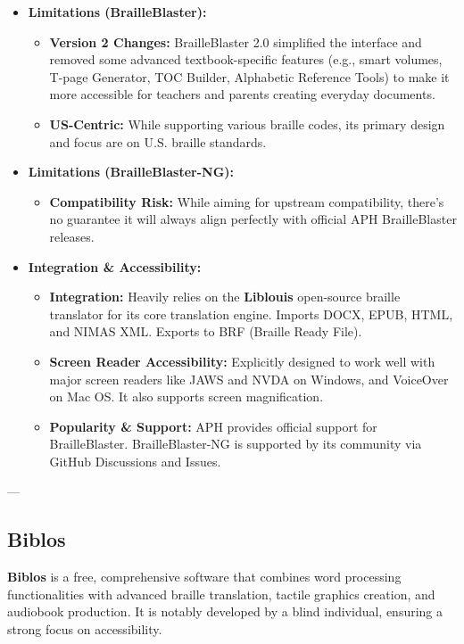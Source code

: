 \begin{itemize}
\begin{itemize}
    \end{itemize}
    \item \textbf{Limitations (BrailleBlaster):}
    \begin{itemize}
        \item \textbf{Version 2 Changes:} BrailleBlaster 2.0 simplified the interface and removed some advanced textbook-specific features (e.g., smart volumes, T-page Generator, TOC Builder, Alphabetic Reference Tools) to make it more accessible for teachers and parents creating everyday documents.
        \item \textbf{US-Centric:} While supporting various braille codes, its primary design and focus are on U.S. braille standards.
    \end{itemize}
    \item \textbf{Limitations (BrailleBlaster-NG):}
    \begin{itemize}
        \item \textbf{Compatibility Risk:} While aiming for upstream compatibility, there's no guarantee it will always align perfectly with official APH BrailleBlaster releases.
    \end{itemize}
    \item \textbf{Integration & Accessibility:}
    \begin{itemize}
        \item \textbf{Integration:} Heavily relies on the \textbf{Liblouis} open-source braille translator for its core translation engine. Imports DOCX, EPUB, HTML, and NIMAS XML. Exports to BRF (Braille Ready File).
        \item \textbf{Screen Reader Accessibility:} Explicitly designed to work well with major screen readers like JAWS and NVDA on Windows, and VoiceOver on Mac OS. It also supports screen magnification.
        \item \textbf{Popularity & Support:} APH provides official support for BrailleBlaster. BrailleBlaster-NG is supported by its community via GitHub Discussions and Issues.
    \end{itemize}
\end{itemize}

---

\subsection{Biblos}
\textbf{Biblos} is a free, comprehensive software that combines word processing functionalities with advanced braille translation, tactile graphics creation, and audiobook production. It is notably developed by a blind individual, ensuring a strong focus on accessibility.

